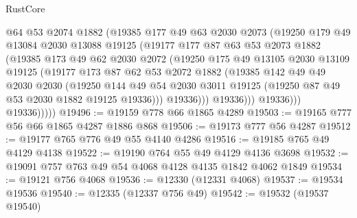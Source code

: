 \begin{lexlean}{RustCore}
\begin{coremodule}
                    @64
                    @53
                    @2074
                    @1882
                    (@19385
                      @177
                      @49
                      @63
                      @2030
                      @2073
                      (@19250
                        @179
                        @49
                        @13084
                        @2030
                        @13088
                        @19125
                        (@19177
                          @177
                          @87
                          @63
                          @53
                          @2073
                          @1882
                          (@19385
                            @173
                            @49
                            @62
                            @2030
                            @2072
                            (@19250
                              @175
                              @49
                              @13105
                              @2030
                              @13109
                              @19125
                              (@19177
                                @173
                                @87
                                @62
                                @53
                                @2072
                                @1882
                                (@19385
                                  @142
                                  @49
                                  @49
                                  @2030
                                  @2030
                                  (@19250
                                    @144
                                    @49
                                    @54
                                    @2030
                                    @3011
                                    @19125
                                    (@19250 @87 @49 @53 @2030 @1882 @19125 @19336)))
                                @19336)))
                          @19336)))
                    @19336)))
              @19336)))))
@19496 := @19159 @778 @66 @1865 @4289
@19503 := @19165 @777 @56 @66 @1865 @4287 @1886 @868
@19506 := @19173 @777 @56 @4287
@19512 := @19177 @765 @776 @49 @55 @4140 @4286
@19516 := @19185 @765 @49 @4129 @4138
@19522 := @19190 @764 @55 @49 @4129 @4136 @3698
@19532 := @19091 @757 @763 @49 @54 @4068 @4128 @4135 @1842 @4062 @1849
@19534 := @19121 @756 @4068
@19536 := @12330 (@12331 @4068)
@19537 := @19534 @19536
@19540 := @12335 (@12337 @756 @49)
@19542 := @19532 (@19537 @19540)

\end{coremodule}
\end{lexlean}
